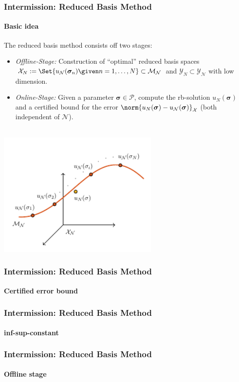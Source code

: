 \begin{frame}[t]
    \frametitle{Intermission: Reduced Basis Method}
    \framesubtitle{Basic idea}

    The reduced basis method consists off two stages:

    \begin{itemize}
        \item {} \emph{Offline-Stage:} Construction of \enquote{optimal} reduced basis spaces $\mathcal X_{N} := \Set{u_{\mathcal N}(\bm \sigma_n) \given n = 1, \dots, N} \subset \mathcal M_{\mathcal N}$ and $\mathcal Y_{N} \subset \mathcal Y_{\mathcal N}$ with low dimension.
        \item {} \emph{Online-Stage:} Given a parameter $\bm \sigma \in \mathcal P$, compute the rb-solution $u_{N}(\bm \sigma)$ and a certified bound for the error $\norm{u_{N}(\bm \sigma) - u_{\mathcal N}(\bm \sigma)}_{\mathcal X}$ (both independent of $\mathcal N$).
    \end{itemize}
    \\[-2em]
    \centering
    \includegraphics[width=0.6\textwidth]{figures/rb.pdf}
\end{frame}

\begin{frame}[t]
    \frametitle{Intermission: Reduced Basis Method}
    \framesubtitle{Certified error bound}

\end{frame}

\begin{frame}[t]
    \frametitle{Intermission: Reduced Basis Method}
    \framesubtitle{inf-sup-constant}

\end{frame}

\begin{frame}[t]
    \frametitle{Intermission: Reduced Basis Method}
    \framesubtitle{Offline stage}

\end{frame}

